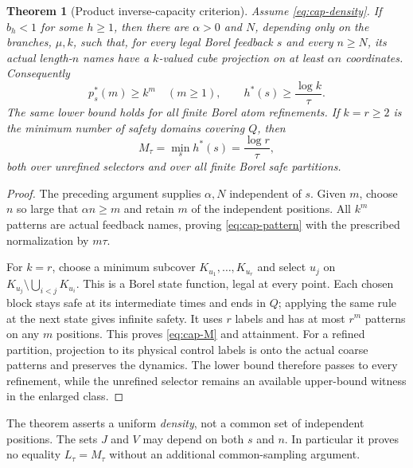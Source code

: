 \documentclass[11pt,reqno]{amsart}
\numberwithin{equation}{section}
\newtheorem{theorem}{Theorem}[section]
\theoremstyle{definition}
\begin{document}
\begin{theorem}[Product inverse-capacity criterion]\label{thm:capacity-main}
Assume \eqref{eq:cap-density}. If $b_h<1$ for some $h\ge1$, then
there are $\alpha>0$ and $N$, depending only on the branches,
$\mu,k$, such that, for every legal Borel feedback $s$ and every
$n\ge N$, its actual length-$n$ names have a $k$-valued cube
projection on at least $\alpha n$ coordinates. Consequently
\begin{equation}\label{eq:cap-pattern}
 p_s^*(m)\ge k^m\quad(m\ge1),\qquad
 h^*(s)\ge\frac{\log k}{\tau}.
\end{equation}
The same lower bound holds for all finite Borel atom refinements.
If $k=r\ge2$ is the minimum number of safety domains covering $Q$,
then
\begin{equation}\label{eq:cap-M}
 M_\tau=\min_s h^*(s)=\frac{\log r}{\tau},
\end{equation}
both over unrefined selectors and over all finite Borel safe partitions.
\end{theorem}
\begin{proof}
The preceding argument supplies $\alpha,N$ independent of $s$.
Given $m$, choose $n$ so large that $\alpha n\ge m$ and retain
$m$ of the independent positions. All $k^m$ patterns are actual
feedback names, proving \eqref{eq:cap-pattern} with the prescribed
normalization by $m\tau$.

For $k=r$, choose a minimum subcover $K_{u_1},\ldots,K_{u_r}$ and
select $u_j$ on $K_{u_j}\setminus\bigcup_{i<j}K_{u_i}$. This is a
Borel state function, legal at every point. Each chosen block stays
safe at its intermediate times and ends in $Q$; applying the same
rule at the next state gives infinite safety. It uses $r$ labels and
has at most $r^m$ patterns on any $m$ positions. This proves
\eqref{eq:cap-M} and attainment. For a refined partition, projection
to its physical control labels is onto the actual coarse patterns
and preserves the dynamics. The lower bound therefore passes to
every refinement, while the unrefined selector remains an available
upper-bound witness in the enlarged class.
\end{proof}

The theorem asserts a uniform \emph{density}, not a common set of
independent positions. The sets $J$ and $V$ may depend on both $s$
and $n$. In particular it proves no equality $L_\tau=M_\tau$
without an additional common-sampling argument.
\end{document}
